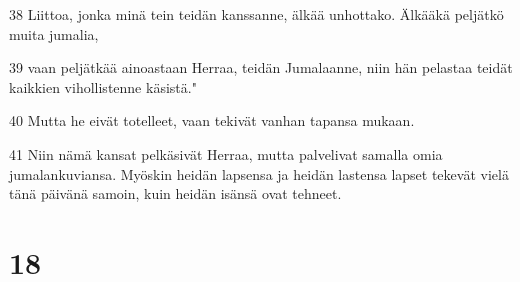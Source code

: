 \par 38 Liittoa, jonka minä tein teidän kanssanne, älkää unhottako. Älkääkä peljätkö muita jumalia,
\par 39 vaan peljätkää ainoastaan Herraa, teidän Jumalaanne, niin hän pelastaa teidät kaikkien vihollistenne käsistä."
\par 40 Mutta he eivät totelleet, vaan tekivät vanhan tapansa mukaan.
\par 41 Niin nämä kansat pelkäsivät Herraa, mutta palvelivat samalla omia jumalankuviansa. Myöskin heidän lapsensa ja heidän lastensa lapset tekevät vielä tänä päivänä samoin, kuin heidän isänsä ovat tehneet.

\chapter{18}

